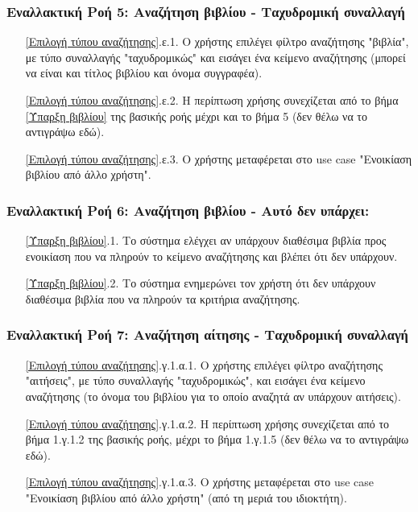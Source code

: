 \documentclass[12pt,a4paper]{article}
\begin{document}
\subsubsection*{Εναλλακτική Ροή 5: Αναζήτηση βιβλίου - Ταχυδρομική συναλλαγή}
\begin{enumerate}
    \item[\ref{Επιλογή τύπου αναζήτησης}.ε.1.] Ο χρήστης επιλέγει φίλτρο αναζήτησης "βιβλία", με τύπο συναλλαγής "ταχυδρομικώς" και εισάγει ένα κείμενο αναζήτησης (μπορεί να είναι και τίτλος βιβλίου και όνομα συγγραφέα).
    \item[\ref{Επιλογή τύπου αναζήτησης}.ε.2.] Η περίπτωση χρήσης συνεχίζεται από το βήμα \ref{Ύπαρξη βιβλίου} της βασικής ροής μέχρι και το βήμα 5 (δεν θέλω να το αντιγράψω εδώ).
    \item[\ref{Επιλογή τύπου αναζήτησης}.ε.3.] Ο χρήστης μεταφέρεται στο use case "Ενοικίαση βιβλίου από άλλο χρήστη".
\end{enumerate}

\subsubsection*{Εναλλακτική Ροή 6: Αναζήτηση βιβλίου - Αυτό δεν υπάρχει:}
\begin{enumerate}
    \item[\ref{Ύπαρξη βιβλίου}.1.] Το σύστημα ελέγχει αν υπάρχουν διαθέσιμα βιβλία προς ενοικίαση που να πληρούν το κείμενο αναζήτησης και βλέπει ότι δεν υπάρχουν.
    \item[\ref{Ύπαρξη βιβλίου}.2.] Το σύστημα ενημερώνει τον χρήστη ότι δεν υπάρχουν διαθέσιμα βιβλία που να πληρούν τα κριτήρια αναζήτησης. 
\end{enumerate}

\subsubsection*{Εναλλακτική Ροή 7: Αναζήτηση αίτησης - Ταχυδρομική συναλλαγή}
\begin{enumerate}
    \item[\ref{Επιλογή τύπου αναζήτησης}.γ.1.α.1.] Ο χρήστης επιλέγει φίλτρο αναζήτησης "αιτήσεις", με τύπο συναλλαγής "ταχυδρομικώς", και εισάγει ένα κείμενο αναζήτησης (το όνομα του βιβλίου για το οποίο αναζητά αν υπάρχουν αιτήσεις).
    \item[\ref{Επιλογή τύπου αναζήτησης}.γ.1.α.2.] Η περίπτωση χρήσης συνεχίζεται από το βήμα 1.γ.1.2 της βασικής ροής, μέχρι το βήμα 1.γ.1.5 (δεν θέλω να το αντιγράψω εδώ).
    \item[\ref{Επιλογή τύπου αναζήτησης}.γ.1.α.3.] Ο χρήστης μεταφέρεται στο use case "Ενοικίαση βιβλίου από άλλο χρήστη" (από τη μεριά του ιδιοκτήτη).
\end{enumerate}
\end{document}
